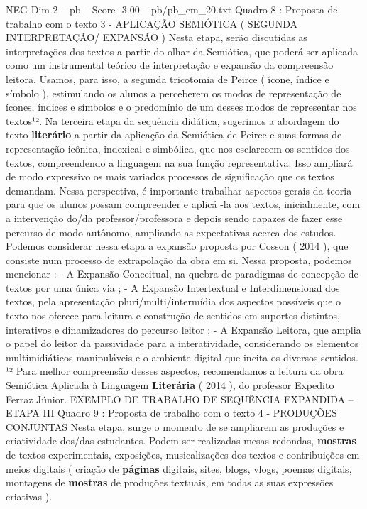 \begin{textsample}{NEG Dim 2 – pb – Score -3.00 – pb/pb\_em\_20.txt}  \label{ex:f2_neg_004}
Quadro 8 : Proposta de trabalho com o texto 3 - APLICAÇÃO SEMIÓTICA ( SEGUNDA INTERPRETAÇÃO/ EXPANSÃO ) Nesta etapa, serão discutidas as interpretações dos textos a partir do olhar da Semiótica, que poderá ser aplicada como um instrumental teórico de interpretação e expansão da compreensão leitora.
Usamos, para isso, a segunda tricotomia de Peirce ( ícone, índice e símbolo ), estimulando os alunos a perceberem os modos de representação de ícones, índices e símbolos e o predomínio de um desses modos de representar nos textos¹².
Na terceira etapa da sequência didática, sugerimos a abordagem do texto \textbf{literário} a partir da aplicação da Semiótica de Peirce e suas formas de representação icônica, indexical e simbólica, que nos esclarecem os sentidos dos textos, compreendendo a linguagem na sua função representativa.
Isso ampliará de modo expressivo os mais variados processos de significação que os textos demandam.
Nessa perspectiva, é importante trabalhar aspectos gerais da teoria para que os alunos possam compreender e aplicá -la aos textos, inicialmente, com a intervenção do/da professor/professora e depois sendo capazes de fazer esse percurso de modo autônomo, ampliando as expectativas acerca dos estudos.
Podemos considerar nessa etapa a expansão proposta por Cosson ( 2014 ), que consiste num processo de extrapolação da obra em si.
Nessa proposta, podemos mencionar : - A Expansão Conceitual, na quebra de paradigmas de concepção de textos por uma única via ; - A Expansão Intertextual e Interdimensional dos textos, pela apresentação pluri/multi/intermídia dos aspectos possíveis que o texto nos oferece para leitura e construção de sentidos em suportes distintos, interativos e dinamizadores do percurso leitor ; - A Expansão Leitora, que amplia o papel do leitor da passividade para a interatividade, considerando os elementos multimidiáticos manipuláveis e o ambiente digital que incita os diversos sentidos. ¹² Para melhor compreensão desses aspectos, recomendamos a leitura da obra Semiótica Aplicada à Linguagem \textbf{Literária} ( 2014 ), do professor Expedito Ferraz Júnior.
EXEMPLO DE TRABALHO DE SEQUÊNCIA EXPANDIDA – ETAPA III Quadro 9 : Proposta de trabalho com o texto 4 - PRODUÇÕES CONJUNTAS Nesta etapa, surge o momento de se ampliarem as produções e criatividade dos/das estudantes.
Podem ser realizadas mesas-redondas, \textbf{mostras} de textos experimentais, exposições, musicalizações dos textos e contribuições em meios digitais ( criação de \textbf{páginas} digitais, sites, blogs, vlogs, poemas digitais, montagens de \textbf{mostras} de produções textuais, em todas as suas expressões criativas ).

\end{textsample}
